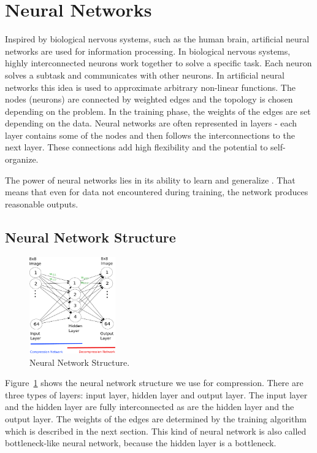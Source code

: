 \section{Neural Networks}
\label{sec:nn}

Inspired by biological nervous systems, such as the human brain, artificial neural networks are used for information processing. In biological nervous systems, highly interconnected neurons work together to solve a specific task. Each neuron solves a subtask and communicates with other neurons. In artificial neural networks this idea is used to approximate arbitrary  non-linear functions. The nodes (neurons) are connected by weighted edges and the topology is chosen depending on the problem. In the training phase, the weights of the edges are set depending on the data. Neural networks are often represented in layers - each layer contains some of the nodes and then follows the interconnections to the next layer. These connections add high flexibility and the potential to self-organize.

The power of neural networks lies in its ability to learn and generalize \cite{Haykin:1998:NNC:521706}. That means that even for data not encountered during training, the network produces reasonable outputs. 

\subsection{Neural Network Structure}
\label{sec:neural_net_structure}
\begin{figure}[tbp]
  \centering
  \includegraphics[width=0.33\textwidth]{images/nnStructure}
  \caption{Neural Network Structure.}
  \label{fig:nnStructure}
\end{figure}

Figure~\ref{fig:nnStructure} shows the neural network structure we use for compression. There are three types of layers: input layer, hidden layer and output layer. The input layer and the hidden layer are fully interconnected as are the hidden layer and the output layer. The weights of the edges are determined by the training algorithm which is described in the next section. This kind of neural network is also called bottleneck-like neural network, because the hidden layer is a bottleneck.

